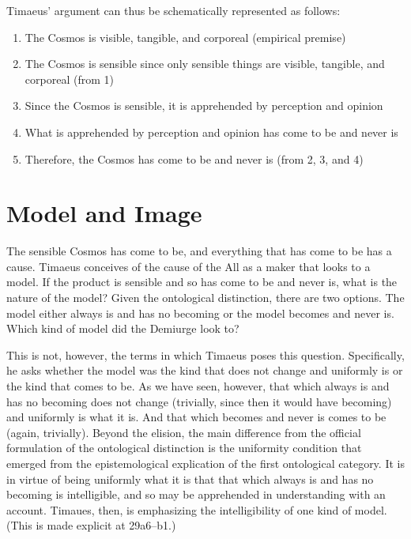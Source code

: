 Timaeus' argument can thus be schematically represented as follows:
\begin{enumerate}[(1)]
	\item The Cosmos is visible, tangible, and corporeal (empirical premise)
	\item The Cosmos is sensible since only sensible things are visible, tangible, and corporeal (from 1)
	\item Since the Cosmos is sensible, it is apprehended by perception and opinion
	\item What is apprehended by perception and opinion has come to be and never is
	\item Therefore, the Cosmos has come to be and never is (from 2, 3, and 4)
\end{enumerate}


\section{Model and Image} %
\label{sec:model_and_image}

The sensible Cosmos has come to be, and everything that has come to be has a cause. Timaeus conceives of the cause of the All as a maker that looks to a model. If the product is sensible and so has come to be and never is, what is the nature of the model? Given the ontological distinction, there are two options. The model either always is and has no becoming or the model becomes and never is. Which kind of model did the Demiurge look to?

This is not, however, the terms in which Timaeus poses this question. Specifically, he asks whether the model was the kind that does not change and uniformly is or the kind that comes to be. As we have seen, however, that which always is and has no becoming does not change (trivially, since then it would have becoming) and uniformly is what it is. And that which becomes and never is comes to be (again, trivially). Beyond the elision, the main difference from the official formulation of the ontological distinction is the uniformity condition that emerged from the epistemological explication of the first ontological category. It is in virtue of being uniformly what it is that that which always is and has no becoming is intelligible, and so may be apprehended in understanding with an account. Timaues, then, is emphasizing the intelligibility of one kind of model. (This is made explicit at 29a6--b1.)

